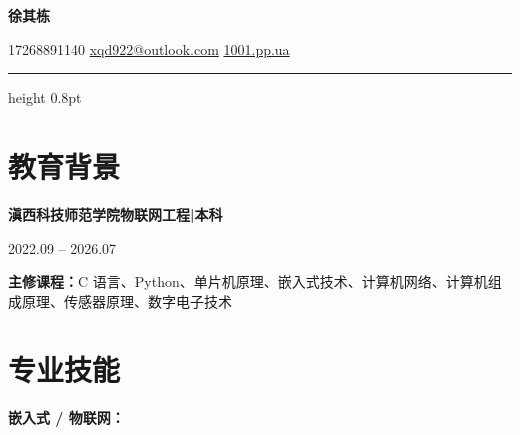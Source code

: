 \documentclass[10pt,a4paper]{article}
\begin{document}
\begin{center}
    {\fontsize{24}{28}\selectfont\bfseries\color{primary} 徐其栋}

    \vspace{0.1em}

    {\color{graytext}
    \faPhone\hspace{0.3em}17268891140
    \hspace{1.2em}
    \faEnvelope\hspace{0.3em}\href{mailto:xqd922@outlook.com}{xqd922@outlook.com}
    \hspace{1.2em}
    \faGlobe\hspace{0.3em}\href{https://1001.pp.ua}{1001.pp.ua}}

\end{center}

\vspace{0.2em}
{\color{rulecolor}\hrule height 0.8pt}

\section{\faGraduationCap\hspace{0.4em}教育背景}

{\bfseries 滇西科技师范学院}\hfill{\bfseries 物联网工程\hspace{0.3em}|\hspace{0.3em}本科}

{\color{graytext} 2022.09 -- 2026.07}

\vspace{0.2em}

{\color{darktext}\textbf{主修课程：}C 语言、Python、单片机原理、嵌入式技术、计算机网络、计算机组成原理、传感器原理、数字电子技术}

\section{\faCogs\hspace{0.4em}专业技能}

{\bfseries\color{primary}嵌入式 / 物联网：}

\vspace{2pt}
\end{document}
